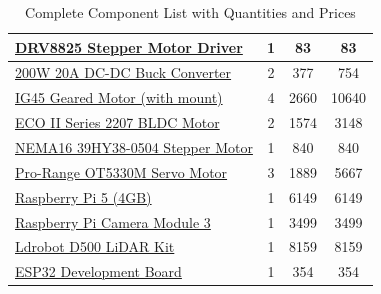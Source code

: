 \documentclass[12pt]{article}
\begin{document}
\begin{table}[!ht]
{\begin{tabular}{|l|c|c|c|}
\hline
\href{https://robu.in/product/drv8825-stepper-motor-driver-with-aluminum-heat-sink/}{DRV8825 Stepper Motor Driver} & 1 & 83 & 83 \\
\hline
\href{https://robu.in/product/200w-20a-dc-dc-buck-converter-step-down-module-constant-current-led-driver-module/}{200W 20A DC-DC Buck Converter} & 2 & 377 & 754 \\
\hline
\href{https://robokits.co.in/motors/ig45-12v-50w-dc-geared-motor/ig45-12v-planetary-geared-motor/industrial-grade-ig45-planetary-dc-geared-motor-50w-300rpm-12v-11kgcm}{IG45 Geared Motor (with mount)} & 4 & 2660 & 10640 \\
\hline
\href{https://robu.in/product/eco-ii-series-2207-1700kv-brushless-motor/}{ECO II Series 2207 BLDC Motor} & 2 & 1574 & 3148 \\
\hline
\href{https://robu.in/product/nema16-39hy38-0504-2-9kg-cm-stepper-motor-round-type-shaft/}{NEMA16 39HY38-0504 Stepper Motor} & 1 & 840 & 840 \\
\hline
\href{https://robu.in/product/orange-ot5330m-7-4v-35-5kg-cm-180-metal-gear-digital-servo-motor/}{Pro-Range OT5330M Servo Motor} & 3 & 1889 & 5667 \\
\hline
\href{https://robocraze.com/products/raspberry-pi-5-4gb}{Raspberry Pi 5 (4GB)} & 1 & 6149 & 6149 \\
\hline
\href{https://robocraze.com/products/raspberry-pi-camera-module-3}{Raspberry Pi Camera Module 3} & 1 & 3499 & 3499 \\
\hline
\href{https://robu.in/product/ldrobot-dtof-lidar-stl-19p-360-omni-directional-lidar/}{Ldrobot D500 LiDAR Kit} & 1 & 8159 & 8159 \\
\hline
\href{https://robocraze.com/products/nodemcu-32-wifi-bluetooth-esp32-development-board30-pin?variant=42268194046176}{ESP32 Development Board} & 1 & 354 & 354 \\
\hline
\end{tabular}
}
\caption{Complete Component List with Quantities and Prices}
\end{table}
\FloatBarrier
\end{document}
